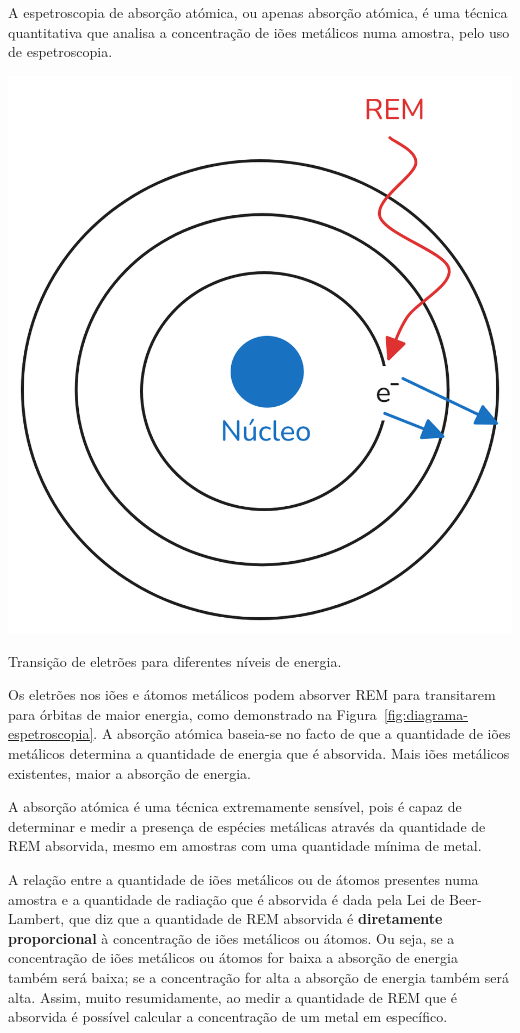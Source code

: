A espetroscopia de absorção atómica, ou apenas absorção atómica, é uma técnica quantitativa que analisa a concentração de iões metálicos numa amostra, pelo uso de espetroscopia.

\begin{marginfigure}
    \centering
    \includegraphics[width=0.8\linewidth]{figures/Diagrama - espetroscopia}
    \caption{Transição de eletrões para diferentes níveis de energia.}
    \label{fig:diagrama-espetroscopia}
\end{marginfigure}

Os eletrões nos iões e átomos metálicos podem absorver REM para transitarem para órbitas de maior energia, como demonstrado na Figura~\ref{fig:diagrama-espetroscopia}.
A absorção atómica baseia-se no facto de que a quantidade de iões metálicos determina a quantidade de energia que é absorvida.
Mais iões metálicos existentes, maior a absorção de energia.

A absorção atómica é uma técnica extremamente sensível, pois é capaz de determinar e medir a presença de espécies metálicas através da quantidade de REM absorvida, mesmo em amostras com uma quantidade mínima de metal.

A relação entre a quantidade de iões metálicos ou de átomos presentes numa amostra e a quantidade de radiação que é absorvida é dada pela Lei de Beer-Lambert, que diz que a quantidade de REM absorvida é \textbf{diretamente proporcional} à concentração de iões metálicos ou átomos.
Ou seja, se a concentração de iões metálicos ou átomos for baixa a absorção de energia também será baixa; se a concentração for alta a absorção de energia também será alta.
Assim, muito resumidamente, ao medir a quantidade de REM que é absorvida é possível calcular a concentração de um metal em específico.

